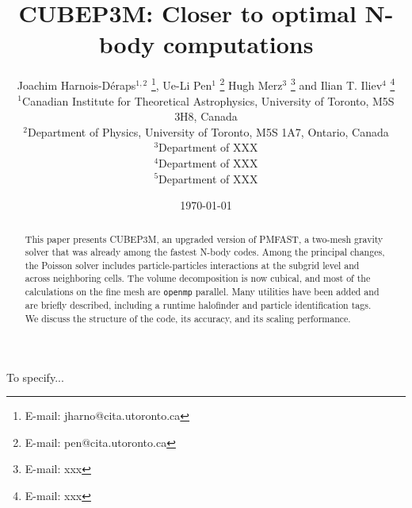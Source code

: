 \documentclass[useAMS,usenatbib]{mn2e}
\title[{\small} CUBEP3M: Closer to optimal N-body computations]{{\small} CUBEP3M: Closer to optimal N-body computations}
\author[Joachim Harnois-D\'{e}raps, Ue-Li Pen, Hugh Merz, Ilian T. Iliev]{Joachim Harnois-D\'{e}raps$^{1,2}$ 
\thanks{E-mail: jharno@cita.utoronto.ca},  Ue-Li Pen$^{1}$ \thanks{E-mail: pen@cita.utoronto.ca} 
Hugh Merz$^{3}$ \thanks{E-mail: xxx} and  Ilian T. Iliev$^{4}$ \thanks{E-mail: xxx}\\
$^{1}$Canadian Institute for Theoretical Astrophysics, University of
Toronto, M5S 3H8, Canada\\
$^{2}$Department of Physics, University of Toronto, M5S 1A7, Ontario,  Canada\\
$^{3}$Department of XXX\\
$^{4}$Department of XXX\\
$^{5}$Department of XXX}
\begin{document}
\date{\today}

\pagerange{\pageref{firstpage}--\pageref{lastpage}} 

\maketitle

\label{firstpage}

\begin{abstract}
This paper presents {\small CUBEP3M}, an upgraded version of {\small PMFAST}, 
a two-mesh gravity solver that was already among the fastest N-body codes. 
Among the principal changes, the Poisson solver includes particle-particles interactions
at the subgrid level and across neighboring cells. The volume decomposition is now cubical,
and most of the calculations on the fine mesh are {\tt openmp} parallel.
Many utilities have been added and are briefly described, including a runtime halofinder
and particle identification tags. 
We discuss the structure of the code, its accuracy, and  its scaling performance.
\end{abstract}

\begin{keywords}
To specify...
\end{keywords}







%


%

{}
%

\bsp

\label{lastpage}
\end{document}
